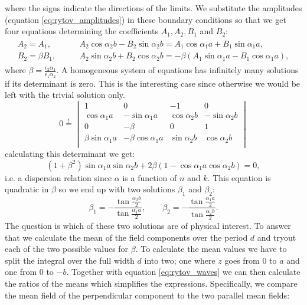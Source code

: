 where the signs indicate the directions of the limits. We substitute the amplitudes (equation \ref{eq:rytov_amplitudes}) in these boundary conditions so that we get four equations determining the coefficients $A_1,A_2,B_1$ and $B_2$:
\begin{align}
\begin{split}
    \label{eq:rytov_waves}
    A_2 = A_1, 
    \qquad
    &A_2\cos \alpha_2 b - B_2 \sin \alpha_2 b= A_1 \cos \alpha_1 a + B_1 \sin \alpha_1 a,
    \\
    B_2=\beta B_1,
    \qquad
    &A_2 \sin \alpha_2 b + B_2 \cos \alpha_2 b = -\beta (A_1 \sin \alpha_1 a - B_1 \cos \alpha_1 a),
\end{split}
\end{align}
where $\beta = \frac{\epsilon_2 \alpha_1}{\epsilon_1 \alpha_2}$. A homogeneous system of equations has infinitely many solutions if its determinant is zero. This is the interesting case since otherwise we would be left with the trivial solution only. 
\begin{equation}
   0\overset{!}{=}
   \begin{vmatrix} 
   1 & 0 & -1 & 0 \\
   \cos \alpha_1 a & -\sin \alpha_1 a & \cos \alpha_2 b & -\sin \alpha_2 b \\
   0 & -\beta & 0 & 1 \\
   \beta \sin \alpha_1 a & -\beta \cos \alpha_1 a & \sin \alpha_2 b & \cos \alpha_2 b \\
   \end{vmatrix} 
\end{equation}
calculating this determinant we get:
\begin{equation}
    (1+\beta^2) \sin \alpha_1 a \sin \alpha_2 b + 2\beta (1-\cos \alpha_1 a \cos \alpha_2 b) = 0,
\end{equation}
i.e. a dispersion relation since $\alpha$ is a function of $n$ and $k$. This equation is quadratic in $\beta$ so we end up with two solutions $\beta_1$ and $\beta_2$:
\begin{equation}
    \beta_1 = -\frac{\tan \frac{\alpha_2 b}{2}}{\tan \frac{\alpha_1 a}{2}},
    \qquad
    \beta_2 = -\frac{\tan \frac{\alpha_1a}{2}}{\tan \frac{\alpha_2 b}{2}}.
\end{equation}
The question is which of these two solutions are of physical interest. To answer that we calculate the mean of the field components over the period $d$ and tryout each of the two possible values for $\beta$. To calculate the mean values we have to split the integral over the full width $d$ into two; one where $z$ goes from $0$ to $a$ and one from $0$ to $-b$. Together with equation \ref{eq:rytov_waves} we can then calculate the ratios of the means which simplifies the expressions. Specifically, we compare the mean field of the perpendicular component to the two parallel mean fields:
